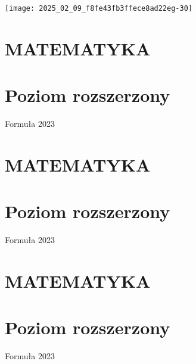 \documentclass[10pt]{article}
\begin{document}
\begin{center}
\texttt{[image: 2025\_02\_09\_f8fe43fb3ffece8ad22eg-30]}
\end{center}

\section*{MATEMATYKA}
\section*{Poziom rozszerzony}
Formuła 2023

\section*{MATEMATYKA}
\section*{Poziom rozszerzony}
Formuła 2023

\section*{MATEMATYKA}
\section*{Poziom rozszerzony}
Formuła 2023
\end{document}

